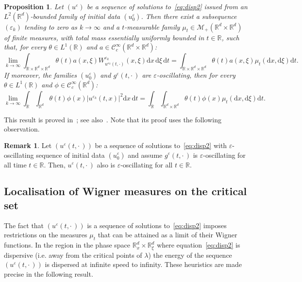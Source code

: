 \documentclass[10pt]{amsart}
\newtheorem{prop}[cdrthm]{Proposition}
\theoremstyle{definition}
\newtheorem{rema}[cdrthm]{Remark}
\newcommand*\R{{\mathbb R}}
\newcommand*\eps{\varepsilon}
\numberwithin{equation}{section}
\newcommand*{\dd}{\mathrm{d}}
\newcommand*{\dt}{\dd t}
\newcommand*{\dx}{\dd x}
\newcommand*{\dxi}{\dd \xi}
\begin{document}
\begin{prop}\label{prop:msc}
Let $(u^{\eps})$ be a sequence of solutions to~\eqref{eq:disp2} issued from an $L^2(\R^d)$-bounded family of initial data $(u^\eps_0)$. Then there exist a subsequence $(\eps_k)$ tending to zero as $k\to\infty$ and a $t$-measurable family $\mu_t\in\mathcal{M}_+(\R^d\times\R^d)$ of finite measures, with total mass essentially uniformly bounded in $t\in\R$, such that, for every $\theta\in L^1(\R)$ and $a\in\mathcal{C}^\infty_c(\R^d\times\R^d)$:
\[
\lim_{k\to\infty}\int_{\R\times\R^d\times\R^d} \theta(t) a(x,\xi)W_{u^{\eps_k}(t,\cdot)}^{\eps_k}(x,\xi)\dx\,\dxi\, \dt=\int_{\R\times\R^d\times\R^d}\theta(t)a(x,\xi)\mu_t(\dx,\dxi)\dt.
\]
If moreover, the families $(u^\eps_0)$ and $g^\eps(t,\cdot\,)$ are $\eps$-oscillating, then for every $\theta\in L^1(\R)$ and $\phi\in {\mathcal C}_c^\infty(\R^d)$:
\[
\lim_{k\to\infty}\int_\R\int_{\R^d} \theta(t) \phi(x)|u^{\eps_{k}}(t,x)|^2 \dx \,\dt=\int_\R\int_{\R^d\times\R^d} \theta(t)\phi(x) \mu_t(\dx,\dxi) \dt.
\]
\end{prop}



This result is proved in~\cite[Theorem~1]{MaciaAv}; see also~\cite[Appendix~B]{MR:16}. Note that its proof uses the following observation.

\begin{rema}\label{remark:tx}
Let $(u^{\eps}(t,\cdot\,))$ be a sequence of solutions to~\eqref{eq:disp2} with $\eps$-oscillating sequence of initial data $(u^\eps_0)$ and assume $g^\eps(t,\cdot\,)$ is $\eps$-oscillating for all time $t\in\R$. Then, $u^\eps(t,\cdot\,)$ also is $\eps$-oscillating for all $t\in\R$.
\end{rema}



\subsection{Localisation of Wigner measures on the critical set}


The fact that $(u^{\eps}(t,\cdot\,))$ is a sequence of solutions to~\eqref{eq:disp2} imposes restrictions on the measures $\mu_t$ that can be attained as a limit of their Wigner functions. In the region in the phase space $\R^d_x\times\R^d_\xi$ where equation~\eqref{eq:disp2} is dispersive (i.e. away from the critical points of $\lambda$) the energy of the sequence $(u^\eps(t,\cdot\,))$ is dispersed at infinite speed to infinity. These heuristics are made precise in the following result.
\end{document}
